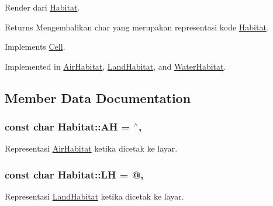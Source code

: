 Render dari \hyperlink{classHabitat}{Habitat}. 

\begin{DoxyReturn}{Returns}
Mengembalikan char yang merupakan representasi kode \hyperlink{classHabitat}{Habitat}. 
\end{DoxyReturn}


Implements \hyperlink{classCell_a1d72940d69d96132a445212155e3e789}{Cell}.



Implemented in \hyperlink{classAirHabitat_a6dd1a0d8235d9687874bb229099d40ff}{Air\+Habitat}, \hyperlink{classLandHabitat_ad2147498f493b01429ae315f0145d3a9}{Land\+Habitat}, and \hyperlink{classWaterHabitat_a014ef4d2a9e5f37ac70a61d3f060b983}{Water\+Habitat}.



\subsection{Member Data Documentation}
\subsubsection[{\texorpdfstring{AH}{AH}}]{\setlength{\rightskip}{0pt plus 5cm}const char Habitat\+::\+AH = \textquotesingle{}$^\wedge$\textquotesingle{}\hspace{0.3cm}{\ttfamily [static]}, {\ttfamily [protected]}}\hypertarget{classHabitat_af5c4388fa9d305995799c61cc6f5231d}{}\label{classHabitat_af5c4388fa9d305995799c61cc6f5231d}


Representasi \hyperlink{classAirHabitat}{Air\+Habitat} ketika dicetak ke layar. 

\subsubsection[{\texorpdfstring{LH}{LH}}]{\setlength{\rightskip}{0pt plus 5cm}const char Habitat\+::\+LH = \textquotesingle{}@\textquotesingle{}\hspace{0.3cm}{\ttfamily [static]}, {\ttfamily [protected]}}\hypertarget{classHabitat_a87fbedb46cde325396e3ef39350e14d7}{}\label{classHabitat_a87fbedb46cde325396e3ef39350e14d7}


Representasi \hyperlink{classLandHabitat}{Land\+Habitat} ketika dicetak ke layar. 

